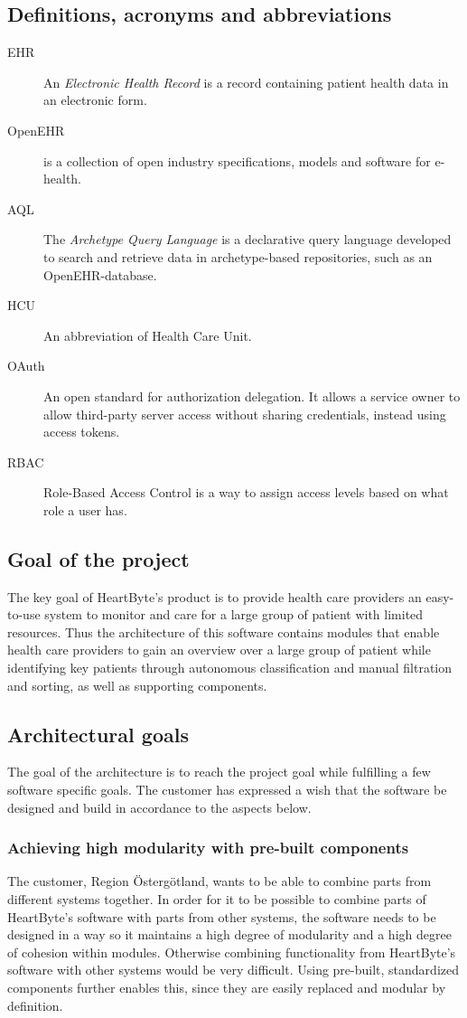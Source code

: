 \documentclass{article}
\begin{document}
\subsection{Definitions, acronyms and abbreviations}
\begin{description}
\item [EHR] An \emph{Electronic Health Record} is a record containing patient health data in an electronic form.
\item [OpenEHR] is a collection of open industry specifications, models and software for e-health.
\item [AQL] The \emph{Archetype Query Language} is a declarative query language developed to search and retrieve data in archetype-based repositories, such as an OpenEHR-database.
\item [HCU] An abbreviation of Health Care Unit.
\item [OAuth] An open standard for authorization delegation. It allows a service owner to allow third-party server access without sharing credentials, instead using access tokens. 
\item [RBAC] Role-Based Access Control is a way to assign access levels based on what role a user has.
\end{description}

\subsection{Goal of the project}
The key goal of HeartByte's product is to provide health care providers an easy-to-use system to monitor and care for a large group of patient with limited resources. Thus the architecture of this software contains modules that enable health care providers to gain an overview over a large group of patient while identifying key patients through autonomous classification and manual filtration and sorting, as well as supporting components.

\subsection{Architectural goals}
The goal of the architecture is to reach the project goal while fulfilling a few software specific goals. The customer has expressed a wish that the software be designed and build in accordance to the aspects below.

\subsubsection{Achieving high modularity with pre-built components}
The customer, Region Östergötland, wants to be able to combine parts from different systems together. In order for it to be possible to combine parts of HeartByte's software with parts from other systems, the software needs to be designed in a way so it maintains a high degree of modularity and a high degree of cohesion within modules. Otherwise combining functionality from HeartByte's software with other systems would be very difficult. Using pre-built, standardized components further enables this, since they are easily replaced and modular by definition.
\end{document}
